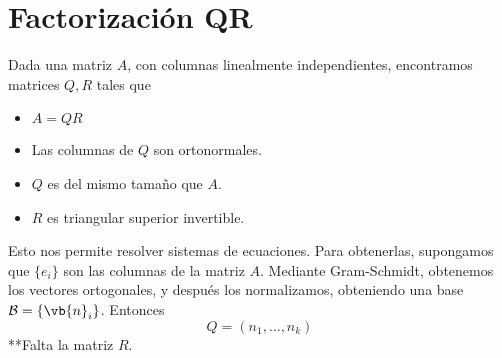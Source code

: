 \documentclass{./Geometria.tex}
\begin{document}
\section{Factorización QR}
Dada una matriz \(A\), con columnas linealmente independientes, encontramos matrices
\(Q,R\) tales que
\begin{itemize}
    \item \(A=QR\)
    \item Las columnas de \(Q\) son ortonormales.
    \item \(Q\) es del mismo tamaño que \(A\).
    \item \(R\) es triangular superior invertible.
\end{itemize}
Esto nos permite resolver sistemas de ecuaciones. Para obtenerlas, supongamos que
\(\{ e_{i} \}\) son las columnas de la matriz \(A\). Mediante Gram-Schmidt, obtenemos
los vectores ortogonales, y después los normalizamos, obteniendo una base
\(\mathcal{B} = \{ \vb{n}_{i} \}\). Entonces
\[
    Q = (n_{1},\dots,n_{k})
\]
**Falta la matriz \(R\).
\end{document}

